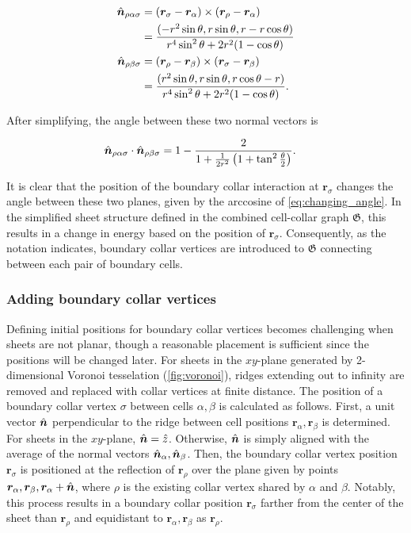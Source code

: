 \begin{align*}
	\hat{\bm{n}}_{\rho\alpha\sigma} &= (\bm{r}_\sigma - \bm{r}_\alpha) \times (\bm{r}_\rho - \bm{r}_\alpha) \\
	&= \frac{(-r^2 \sin\theta, r\sin\theta, r - r\cos\theta)}{r^4\sin^2\theta + 2r^2(1-\cos\theta)} \\
	\hat{\bm{n}}_{\rho\beta\sigma} &= (\bm{r}_{\rho} - \bm{r}_\beta) \times (\bm{r}_\sigma - \bm{r}_\beta)\\
	&= \frac{(r^2 \sin\theta, r\sin\theta, r\cos\theta - r)}{r^4\sin^2\theta + 2r^2(1-\cos\theta)}.
\end{align*}

\noindent After simplifying, the angle between these two normal vectors is 

\begin{align}
	\hat{\bm{n}}_{\rho\alpha\sigma} \cdot \hat{\bm{n}}_{\rho\beta\sigma} &= 1 - \frac{2}{1 + \frac{1}{2r^2} \left( 1 + \tan^2 \frac{\theta}{2}\right)}. \label{eq:changing_angle}
\end{align}

It is clear that the position of the boundary collar interaction at $\bm{r}_\sigma$ changes the angle between these two planes, given by the arccosine of \cref{eq:changing_angle}. In the simplified sheet structure defined in the combined cell-collar graph $\mathfrak{G}$, this results in a change in energy based on the position of $\bm{r}_\sigma$. Consequently, as the notation indicates, boundary collar vertices are introduced to $\mathfrak{G}$ connecting between each pair of boundary cells.

\subsubsection{Adding boundary collar vertices}

Defining initial positions for boundary collar vertices becomes challenging when sheets are not planar, though a reasonable placement is sufficient since the positions will be changed later. For sheets in the $xy$-plane generated by 2-dimensional Voronoi tesselation (\cref{fig:voronoi}), ridges extending out to infinity are removed and replaced with collar vertices at finite distance. The position of a boundary collar vertex $\sigma$ between cells $\alpha, \beta$ is calculated as follows. 
First, a unit vector $\hat{\bm{n}}$ perpendicular to the ridge between cell positions $\bm{r}_\alpha, \bm{r}_\beta$ is determined. 
For sheets in the $xy$-plane, $\hat{\bm{n}}=\hat{z}$. Otherwise, $\hat{\bm{n}}$ is simply aligned with the average of the normal vectors $\hat{\bm{n}}_\alpha, \hat{\bm{n}}_\beta$.
Then, the boundary collar vertex position $\bm{r}_\sigma$ is positioned at the reflection of $\bm{r}_\rho$ over the plane given by points $\bm{r}_\alpha, \bm{r}_\beta, \bm{r}_\alpha + \hat{\bm{n}}$, where $\rho$ is the existing collar vertex shared by $\alpha$ and $\beta$.
Notably, this process results in a boundary collar position $\bm{r}_\sigma$ farther from the center of the sheet than $\bm{r}_\rho$ and equidistant to $\bm{r}_\alpha, \bm{r}_\beta$ as $\bm{r}_\rho$. 

